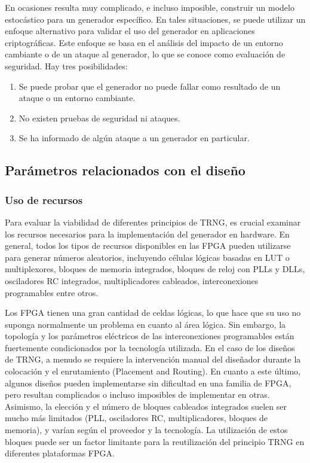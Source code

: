             En ocasiones resulta muy complicado, e incluso imposible, construir un modelo estocástico para un generador específico. En tales situaciones, se puede utilizar un enfoque alternativo para validar el uso del generador en aplicaciones criptográficas. Este enfoque se basa en el análisis del impacto de un entorno cambiante o de un ataque al generador, lo que se conoce como evaluación de seguridad. Hay tres posibilidades: 
            
            \begin{enumerate}[noitemsep, label=(\roman*)]
                \item Se puede probar que el generador no puede fallar como resultado de un ataque o un entorno cambiante.
                \item No existen pruebas de seguridad ni ataques.
                \item Se ha informado de algún ataque a un generador en particular.
            \end{enumerate}		

        \subsection{Parámetros relacionados con el diseño}	
    
            \subsubsection{Uso de recursos}
            
            Para evaluar la viabilidad de diferentes principios de TRNG, es crucial examinar los recursos necesarios para la implementación del generador en hardware. En general, todos los tipos de recursos disponibles en las FPGA pueden utilizarse para generar números aleatorios, incluyendo células lógicas basadas en LUT o multiplexores, bloques de memoria integrados, bloques de reloj con PLLs y DLLs, osciladores RC integrados, multiplicadores cableados, interconexiones programables entre otros.
                
            Los FPGA tienen una gran cantidad de celdas lógicas, lo que hace que su uso no suponga normalmente un problema en cuanto al área lógica. Sin embargo, la topología y los parámetros eléctricos de las interconexiones programables están fuertemente condicionados por la tecnología utilizada. En el caso de los diseños de TRNG, a menudo se requiere la intervención manual del diseñador durante la colocación y el enrutamiento (Placement and Routing). En cuanto a este último, algunos diseños pueden implementarse sin dificultad en una familia de FPGA, pero resultan complicados o incluso imposibles de implementar en otras. Asimismo, la elección y el número de bloques cableados integrados suelen ser mucho más limitados (PLL, osciladores RC, multiplicadores, bloques de memoria), y varían según el proveedor y la tecnología. La utilización de estos bloques puede ser un factor limitante para la reutilización del principio TRNG en diferentes plataformas FPGA.

